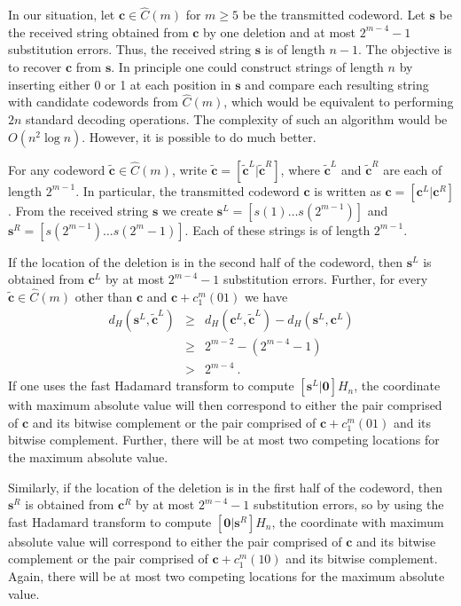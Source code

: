 In our situation,
let $\mathbf{c} \in \hat{C}(m)$ for $m \geq 5$ be the transmitted
codeword. Let $\mathbf{s}$ be the received string obtained from
$\mathbf{c}$ by one deletion and at most $2^{m-4}-1$ substitution
errors. Thus, the
received string $\mathbf{s}$ is of length $n-1$.
The objective is to recover $\mathbf{c}$ from
$\mathbf{s}$.
In principle one could construct
strings of length $n$ by inserting either 0 or 1 at each position
in $\mathbf{s}$ and compare each resulting string with candidate
codewords from $\hat{C}(m)$, which would be equivalent to
performing $2n$ standard decoding operations.
The complexity of such an algorithm would be $O(n^2 \log n)$.
However, it is possible to do much better.

For any codeword $\tilde{\mathbf{c}} \in \hat{C}(m)$, write
$\tilde{\mathbf{c}} = \left[ \tilde{\mathbf{c}}^L |
\tilde{\mathbf{c}}^R \right]$, where $\tilde{\mathbf{c}}^L$ and
$\tilde{\mathbf{c}}^R$ are each of length $2^{m-1}$. In
particular, the transmitted codeword $\mathbf{c}$ is written as
$\mathbf{c} = \left[ \mathbf{c}^L | \mathbf{c}^R \right]$. From
the received string $\mathbf{s}$ we create $\mathbf{s}^L = \left[
s(1) \ldots s(2^{m-1}) \right]$ and $\mathbf{s}^R = \left[
s(2^{m-1}) \ldots s(2^m -1) \right]$. Each of these strings is of
length $2^{m-1}$.

If the location of the deletion is in the second half of the
codeword, then $\mathbf{s}^L$ is obtained from $\mathbf{c}^L$ by
at most  $2^{m-4}-1$ substitution errors. Further, for every
$\tilde{\mathbf{c}} \in \hat{C}(m)$ other than $\mathbf{c}$ and
$\mathbf{c} + c_1^m(01)$ we have
\begin{eqnarray*}
d_H(\mathbf{s}^L, \tilde{\mathbf{c}}^L) &\ge& d_H(\mathbf{c}^L,
\tilde{\mathbf{c}}^L) - d_H(\mathbf{s}^L, \mathbf{c}^L)\\
{}& \ge& 2^{m-2} - (2^{m-4} -1)\\ {}&> &2^{m-4}~.
\end{eqnarray*}
If one uses the fast Hadamard transform to compute $\left[
\mathbf{s}^L | \mathbf{0} \right] H_n$, the coordinate with
maximum absolute value will then correspond to either the pair
comprised of $\mathbf{c}$ and its bitwise complement or the pair
comprised of $\mathbf{c} + c_1^m(01)$ and its bitwise complement.
Further, there will be at most two competing locations for the
maximum absolute value.

Similarly, if the location of the deletion is in the first half of
the codeword, then $\mathbf{s}^R$ is obtained from $\mathbf{c}^R$
by at most  $2^{m-4}-1$ substitution errors, so by using the fast
Hadamard transform to compute $\left[ \mathbf{0} | \mathbf{s}^R
\right] H_n$, the coordinate with maximum absolute value will
correspond to either the pair comprised of $\mathbf{c}$ and its
bitwise complement or the pair comprised of $\mathbf{c} +
c_1^m(10)$ and its bitwise complement. Again, there will be at
most two competing locations for the maximum absolute value.

